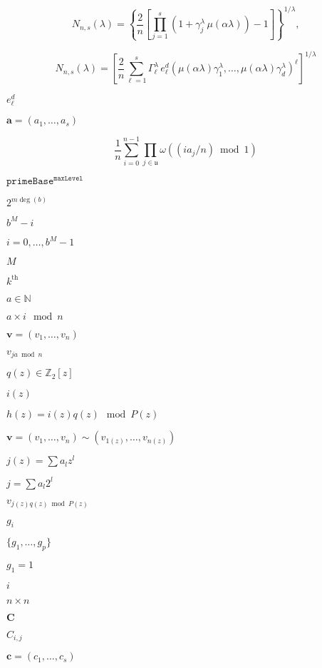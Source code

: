 \documentclass{article}
\begin{document}
\[   N_{n,s}(\lambda) =
   \left\{
      \frac{2}{n}
      \left[
        \prod_{j=1}^s
        \left( 1 + \gamma_j^\lambda \, \mu(\alpha\lambda) \right)
        - 1
      \right]
   \right\}^{1/\lambda},
\]
\pagebreak

\[   N_{n,s}(\lambda) =
   \left[
      \frac{2}{n}
      \sum_{\ell=1}^s \Gamma_\ell^\lambda \,
      e_\ell^d \left( \mu(\alpha\lambda) \gamma_1^\lambda, \dots, \mu(\alpha\lambda) \gamma_d^\lambda  \right)^\ell
   \right]^{1/\lambda}
\]
\pagebreak

$e_\ell^d$
\pagebreak

$\boldsymbol a=(a_1, \dots, a_s)$
\pagebreak

\[  \frac1n \sum_{i=0}^{n-1}
  \prod_{j \in \mathfrak u} \omega((i a_j / n) \bmod 1)
\]
\pagebreak

$\mathtt{primeBase}^{\mathtt{maxLevel}}$
\pagebreak

$2^{m\deg(b)}$
\pagebreak

$b^M - i$
\pagebreak

$i = 0, \dots, b^M - 1$
\pagebreak

$M$
\pagebreak

$k^{\text{th}}$
\pagebreak

$a \in \mathbb{N}$
\pagebreak

$a \times i \mod n$
\pagebreak

$\boldsymbol v = (v_1, \dots, v_n)$
\pagebreak

$v_{j a \bmod n}$
\pagebreak

$q(z) \in \mathbb{Z}_2[z]$
\pagebreak

$i(z)$
\pagebreak

$h(z) = i(z)q(z) \mod P(z)$
\pagebreak

$\boldsymbol v = (v_1, \dots, v_n) \sim (v_{1(z)}, \dots, v_{n(z)})$
\pagebreak

$j(z) = \sum a_lz^l$
\pagebreak

$j = \sum a_l2^l$
\pagebreak

$v_{j(z) q(z) \bmod P(z)}$
\pagebreak

$g_i$
\pagebreak

$\{ g_1, \dots, g_p \}$
\pagebreak

$g_1 = 1$
\pagebreak

$ i $
\pagebreak

$n \times n$
\pagebreak

$\boldsymbol C$
\pagebreak

$C_{i,j}$
\pagebreak

$\boldsymbol c = (c_1,\dots,c_s)$
\pagebreak
\end{document}
